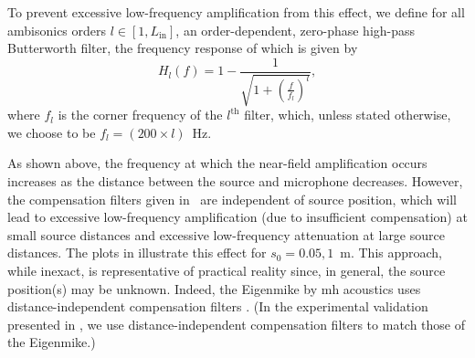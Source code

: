 To prevent excessive low-frequency amplification from this effect, we define for all ambisonics orders $l \in [1, L_\textrm{in}]$, an order-dependent, zero-phase high-pass Butterworth filter, the frequency response of which is given by
\begin{equation}\label{eq:02_Acoustical_Theory:NearField_HPF}
H_l(f) = 1 - \frac{1}{\sqrt{1 + \left( \frac{f}{f_l} \right)^l}},
\end{equation}
where $f_l$ is the corner frequency of the $l^\textrm{th}$ filter,
which, unless stated otherwise, we choose to be $f_l = (200 \times l)$~Hz.

As shown above, the frequency at which the near-field amplification occurs increases as the distance between the source and microphone decreases.
However, the compensation filters given in~ are independent of source position, which will lead to excessive low-frequency amplification (due to insufficient compensation) at small source distances and excessive low-frequency attenuation at large source distances.
The plots in  illustrate this effect for $s_0 = 0.05, 1$~m.
This approach, while inexact, is representative of practical reality since, in general, the source position(s) may be unknown.
Indeed, the Eigenmike by mh acoustics uses distance-independent compensation filters \citep[section 4.3]{EigenUnitsManual2018}.
(In the experimental validation presented in , we use distance-independent compensation filters to match those of the Eigenmike.)

